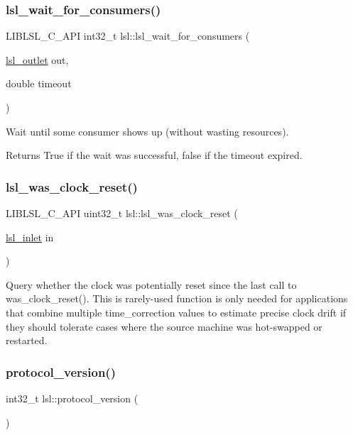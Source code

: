 \subsubsection{\texorpdfstring{lsl\+\_\+wait\+\_\+for\+\_\+consumers()}{lsl\_wait\_for\_consumers()}}
{\footnotesize\ttfamily L\+I\+B\+L\+S\+L\+\_\+\+C\+\_\+\+A\+PI int32\+\_\+t lsl\+::lsl\+\_\+wait\+\_\+for\+\_\+consumers (\begin{DoxyParamCaption}\item[{\hyperlink{namespacelsl_abcf512b0f66dacf86c10b165995fd50b}{lsl\+\_\+outlet}}]{out,  }\item[{double}]{timeout }\end{DoxyParamCaption})}

Wait until some consumer shows up (without wasting resources). \begin{DoxyReturn}{Returns}
True if the wait was successful, false if the timeout expired. 
\end{DoxyReturn}
\mbox{\label{namespacelsl_a3b98f7920895623517758ed1500bcad3}} 
\subsubsection{\texorpdfstring{lsl\+\_\+was\+\_\+clock\+\_\+reset()}{lsl\_was\_clock\_reset()}}
{\footnotesize\ttfamily L\+I\+B\+L\+S\+L\+\_\+\+C\+\_\+\+A\+PI uint32\+\_\+t lsl\+::lsl\+\_\+was\+\_\+clock\+\_\+reset (\begin{DoxyParamCaption}\item[{\hyperlink{namespacelsl_a884a3363cfcba75d7ce8f00c1c4c54f1}{lsl\+\_\+inlet}}]{in }\end{DoxyParamCaption})}

Query whether the clock was potentially reset since the last call to was\+\_\+clock\+\_\+reset(). This is rarely-\/used function is only needed for applications that combine multiple time\+\_\+correction values to estimate precise clock drift if they should tolerate cases where the source machine was hot-\/swapped or restarted. \mbox{\label{namespacelsl_a59009e83a8f0e33643474b373ad2f7f2}} 
\subsubsection{\texorpdfstring{protocol\+\_\+version()}{protocol\_version()}}
{\footnotesize\ttfamily int32\+\_\+t lsl\+::protocol\+\_\+version (\begin{DoxyParamCaption}{ }\end{DoxyParamCaption})\hspace{0.3cm}{\ttfamily [inline]}}

